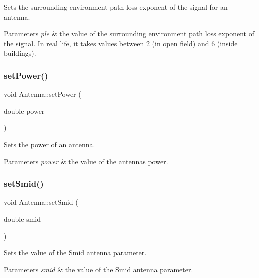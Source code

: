 Sets the surrounding environment\textquotesingle{} path loss exponent of the signal for an antenna. 
\begin{DoxyParams}{Parameters}
{\em ple} & the value of the surrounding environment\textquotesingle{} path loss exponent of the signal. In real life, it takes values between 2 (in open field) and 6 (inside buildings). \\
\hline
\end{DoxyParams}
\mbox{\label{class_antenna_a172a4c7765dea045d6504f6e2cbe0f59}} 
\subsubsection{\texorpdfstring{set\+Power()}{setPower()}}
{\footnotesize\ttfamily void Antenna\+::set\+Power (\begin{DoxyParamCaption}\item[{double}]{power }\end{DoxyParamCaption})}

Sets the power of an antenna. 
\begin{DoxyParams}{Parameters}
{\em power} & the value of the antenna\textquotesingle{}s power. \\
\hline
\end{DoxyParams}
\mbox{\label{class_antenna_a67e5ae0106189d18e4f114d8e0e14a09}} 
\subsubsection{\texorpdfstring{set\+Smid()}{setSmid()}}
{\footnotesize\ttfamily void Antenna\+::set\+Smid (\begin{DoxyParamCaption}\item[{double}]{smid }\end{DoxyParamCaption})}

Sets the value of the Smid antenna parameter. 
\begin{DoxyParams}{Parameters}
{\em smid} & the value of the Smid antenna parameter. \\
\hline
\end{DoxyParams}
\mbox{\label{class_antenna_a92357bee36ba7dcfd08c4d2ce2280e3c}} 

